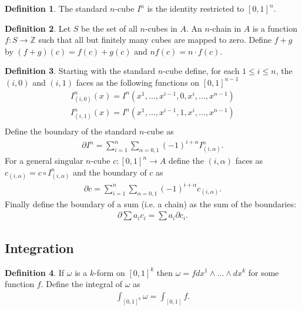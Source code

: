 \documentclass[20pt]{article}
\theoremstyle{plain}
\theoremstyle{definition}
\newtheorem{definition}{Definition}
\newcommand{\integers}{\mathbb{Z}}
\begin{document}
\begin{definition}
  The standard $n$-cube $I^n$ is the identity restricted to $[0, 1]^n$.
\end{definition}

\begin{definition}
  Let $S$ be the set of all $n$-cubes in $A$.  An $n$-chain in $A$ is a function
  $f: S \to \integers$ such that all but finitely many cubes are mapped to zero.
  Define $f + g$ by $(f+g)(c) = f(c) + g(c)$ and $nf(c) = n \cdot f(c)$.
\end{definition}

\begin{definition}
  Starting with the standard $n$-cube define, for each
  $1 \leq i \leq n$, the $(i, 0)$ and $(i, 1)$ faces as the following
  functions on $[0, 1]^{n-1}$
  \begin{align*}
    I^n_{(i,0)}(x) = I^n(x^1, ..., x^{i-1}, 0, x^i, ..., x^{n-1}) \\
    I^n_{(i,1)}(x) = I^n(x^1, ..., x^{i-1}, 1, x^i, ..., x^{n-1}) \\
  \end{align*}
  Define the boundary of the standard $n$-cube as
  \begin{align*}
    \partial I^n = \sum_{i=1}^n \sum_{\alpha = 0, 1} (-1)^{i + \alpha}I^n_{(i, \alpha)}.
  \end{align*}
  For a general singular $n$-cube $c: [0, 1]^n \to A$ define the $(i, \alpha)$ faces as
  $c_{(i, \alpha)} = c \circ I^n_{(i, \alpha)}$
  and the boundary of $c$ as
  \begin{align*}
    \partial c = \sum_{i=1}^n \sum_{\alpha = 0, 1} (-1)^{i + \alpha}c_{(i, \alpha)}.
  \end{align*}
  Finally define the boundary of a sum (i.e. a chain) as the sum of the boundaries:
  \begin{align*}
    \partial \sum a_ic_i = \sum a_i \partial c_i.
  \end{align*}
\end{definition}




















\subsection{Integration}
\begin{definition}
	If $\omega$ is a $k$-form on $[0,1]^k$ then $\omega = f dx^1 \wedge ... \wedge dx^k$
	for some function $f$.  Define the integral of $\omega$ as
	\begin{align*}
		\int_{[0,1]^k} \omega = \int_{[0,1]} f.
	\end{align*}
\end{definition}
\end{document}
